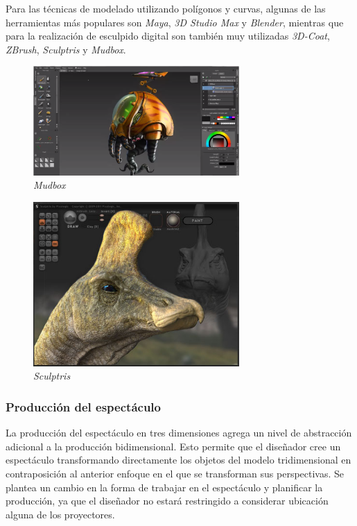 Para las técnicas de modelado utilizando polígonos y curvas, algunas de las herramientas más populares son \emph{Maya}\cite{Maya}, \emph{3D Studio Max}\cite{3DStudioMax} y \emph{Blender}\cite{Blender}, mientras que para la realización de esculpido digital son también muy utilizadas \emph{3D-Coat}\cite{3DCoat}, \emph{ZBrush}\cite{Zbrush}, \emph{Sculptris}\cite{Sculptris} y \emph{Mudbox}\cite{Mudbox}. 

\begin{figure}[H]
  \centering
    \includegraphics[width=0.7\textwidth]{./Cap2_videomapping/mudbox.png}
  \caption[http://usa.autodesk.com]{\emph{Mudbox}}
  \label{fig:Mudbox}
\end{figure}

\begin{figure}[H]
  \centering
    \includegraphics[width=0.7\textwidth]{./Cap2_videomapping/sculptris.png}
  \caption[http://www.pixologic.com/sculptris/]{\emph{Sculptris}}
  \label{fig:Sculptris}
\end{figure}
  
\subsubsection{Producción del espectáculo}
La producción del espectáculo en tres dimensiones agrega un nivel de abstracción adicional a la producción bidimensional. Esto permite que el diseñador cree un espectáculo transformando directamente los objetos del modelo tridimensional en contraposición al anterior enfoque en el que se transforman sus perspectivas.
Se plantea un cambio en la forma de trabajar en el espectáculo y planificar la producción, ya que el diseñador no estará restringido a considerar ubicación alguna de los proyectores.

